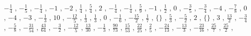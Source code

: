 \documentclass[12pt,fleqn]{article}
\theoremstyle{aufg}
\theoremstyle{bsp}
\begin{document}
\begin{flushleft}
$ \scriptstyle- \frac{1}{4}$ , $ \scriptstyle- \frac{1}{5}$ , $ \scriptstyle- \frac{1}{4}$ , $ \scriptstyle-1$ , $ \scriptstyle-2$ , $ \scriptstyle\frac{1}{4}$ , $ \scriptstyle\frac{5}{4}$ , $ \scriptstyle2$ , $ \scriptstyle- \frac{1}{4}$ , $ \scriptstyle- \frac{1}{4}$ , $ \scriptstyle\frac{5}{9}$ , $ \scriptstyle-1$ , $ \scriptstyle\frac{1}{2}$ , $ \scriptstyle0$ , $ \scriptstyle- \frac{3}{5}$ , $ \scriptstyle- \frac{3}{4}$ , $ \scriptstyle-4$ , $ \scriptstyle- \frac{7}{8}$ , $ \scriptstyle0$ , $ \scriptstyle-4$ , $ \scriptstyle-3$ , $ \scriptstyle- \frac{1}{3}$ , $ \scriptstyle10$ , $ \scriptstyle- \frac{12}{5}$ , $ \scriptstyle\frac{1}{3}$ , $ \scriptstyle\frac{1}{3}$ , $ \scriptstyle0$ , $ \scriptstyle- \frac{1}{6}$ , $ \scriptstyle- \frac{15}{2}$ , $ \scriptstyle\frac{1}{7}$ , $ \scriptstyle\{\}$ , $ \scriptstyle\frac{5}{3}$ , $ \scriptstyle- \frac{5}{2}$ , $ \scriptstyle2$ , $ \scriptstyle\{\}$ , $ \scriptstyle3$ , $ \scriptstyle\frac{13}{2}$ , $ \scriptstyle- \frac{3}{4}$ , $ \scriptstyle- \frac{5}{8}$ , $ \scriptstyle- \frac{31}{54}$ , $ \scriptstyle\frac{43}{64}$ , $ \scriptstyle- \frac{3}{2}$ , $ \scriptstyle- \frac{12}{5}$ , $ \scriptstyle\frac{13}{30}$ , $ \scriptstyle- \frac{1}{3}$ , $ \scriptstyle\frac{90}{73}$ , $ \scriptstyle\frac{15}{53}$ , $ \scriptstyle\frac{22}{25}$ , $ \scriptstyle\frac{2}{5}$ , $ \scriptstyle- \frac{24}{13}$ , $ \scriptstyle- \frac{13}{3}$ , $ \scriptstyle- \frac{23}{16}$ , $ \scriptstyle\frac{25}{7}$ , $ \scriptstyle\frac{25}{2}$ , \end{flushleft} 
\end{document}
